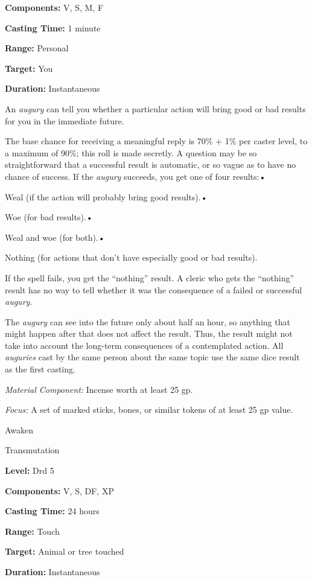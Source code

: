 \documentclass{article}
\begin{document}
\textbf{Components:} V, S, M, F

\textbf{Casting Time:} 1 minute

\textbf{Range:} Personal

\textbf{Target:} You

\textbf{Duration:} Instantaneous

An \textit{augury }can tell you whether a particular action will bring good or 
bad results for you in the immediate future.

The base chance for receiving a meaningful reply is 70\% + 1\% per caster level, 
to a maximum of 90\%; this roll is made secretly. A question may be so straightforward 
that a successful result is automatic, or so vague as to have no chance of success. 
If the \textit{augury }succeeds, you get one of four results:• 

Weal (if the action will probably bring good results).• 

Woe (for bad results).• 

Weal and woe (for both).• 

Nothing (for actions that don't have especially good or bad results).

If the spell fails, you get the ``nothing'' result. A cleric who gets the ``nothing'' 
result has no way to tell whether it was the consequence of a failed or successful 
\textit{augury.}

The \textit{augury }can see into the future only about half an hour, so anything 
that might happen after that does not affect the result. Thus, the result might 
not take into account the long-term consequences of a contemplated action. All 
\textit{auguries }cast by the same person about the same topic use the same dice 
result as the first casting.

\textit{Material Component: }Incense worth at least 25 gp.

\textit{Focus: }A set of marked sticks, bones, or similar tokens of at least 25 
gp value.

\vspace{12pt}
Awaken

Transmutation

\textbf{Level:} Drd 5

\textbf{Components:} V, S, DF, XP

\textbf{Casting Time:} 24 hours

\textbf{Range:} Touch

\textbf{Target:} Animal or tree touched

\textbf{Duration:} Instantaneous
\end{document}
